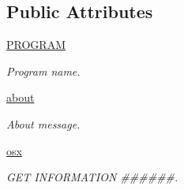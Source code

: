 \subsection*{Public Attributes}
\begin{DoxyCompactItemize}
\item 
\hyperlink{classmolSimplify_1_1Classes_1_1globalvars_1_1globalvars_a84928cd131f775a7a5ac771d3115884a}{P\+R\+O\+G\+R\+AM}
\begin{DoxyCompactList}\small\item\em Program name. \end{DoxyCompactList}\item 
\hyperlink{classmolSimplify_1_1Classes_1_1globalvars_1_1globalvars_a8645755df959297ba1969ac81b980d38}{about}
\begin{DoxyCompactList}\small\item\em About message. \end{DoxyCompactList}\item 
\hyperlink{classmolSimplify_1_1Classes_1_1globalvars_1_1globalvars_accca7a3b1858d67c294197ae1b967e07}{osx}
\begin{DoxyCompactList}\small\item\em G\+ET I\+N\+F\+O\+R\+M\+A\+T\+I\+ON \#\#\#\#\#\#. \end{DoxyCompactList}\end{DoxyCompactItemize}
